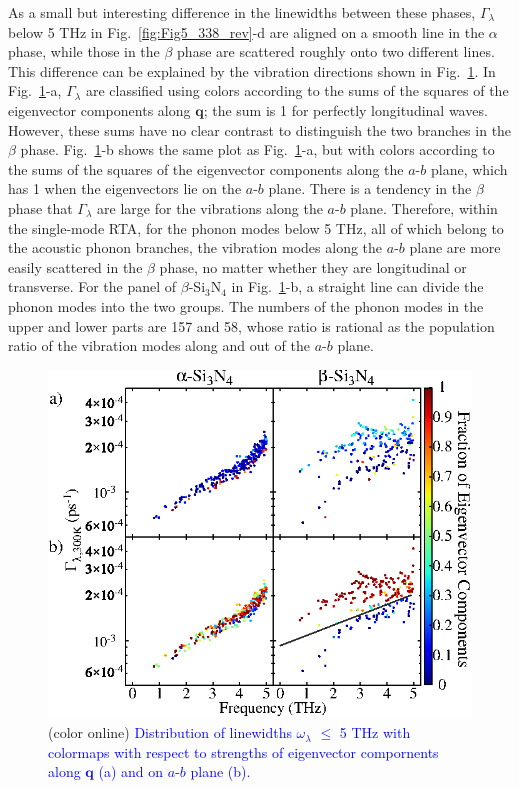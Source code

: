 \documentclass[twocolumn,amsmath,amssymb,a4paper,prb,superscriptaddress,floatfix]{revtex4-1}
\begin{document}
As a small but interesting difference in the linewidths between these phases,
$\Gamma_\lambda$ below 5 THz in Fig.~\ref{fig:Fig5_338_rev}-d are aligned on a
smooth line in the $\alpha$ phase, while those in the $\beta$ phase are
scattered roughly onto two different lines. This difference can be explained by
the vibration directions shown in Fig.~\ref{fig:Fig7_338}. In
Fig.~\ref{fig:Fig7_338}-a, $\Gamma_\lambda$ are classified using colors
according to the sums of the squares of the eigenvector components along $\mathbf{q}$; the
sum is 1 for perfectly longitudinal waves. However, these sums have no clear
contrast to distinguish the two branches in the $\beta$ phase.
Fig.~\ref{fig:Fig7_338}-b shows the same plot as Fig.~\ref{fig:Fig7_338}-a, but
with colors according to the sums of the squares of the eigenvector components
along the $a$-$b$ plane, which has 1 when the eigenvectors lie on the $a$-$b$
plane. There is a tendency in the $\beta$ phase that  $\Gamma_\lambda$ are
large for the vibrations along the $a$-$b$ plane. Therefore, within the
single-mode RTA, for the phonon modes below 5 THz, all of which belong to the
acoustic phonon branches, the vibration modes along the $a$-$b$ plane are more
easily scattered in the $\beta$ phase, no matter whether they are longitudinal
or transverse. For the panel of $\beta$-Si$_3$N$_4$ in
Fig.~\ref{fig:Fig7_338}-b, a straight line can divide the phonon modes into the
two groups. The numbers of the phonon modes in the upper and lower parts are
157 and 58, whose ratio is rational as the population ratio of the vibration
modes along and out of the $a$-$b$ plane.


\begin{figure}[ht]
 \centering
  \includegraphics[width=\linewidth]{figure_analyze_gamma3_m1010_print.eps} \caption{(color
	  online) \textcolor{blue}{Distribution of linewidths $\omega_\lambda$ $\leq$ 5 THz
		  with colormaps with respect to strengths of eigenvector compornents along $\mathbf q$ (a)
		  and on $a$-$b$ plane (b).} \label{fig:Fig7_338}} 
 \centering
\end{figure}
\end{document}
